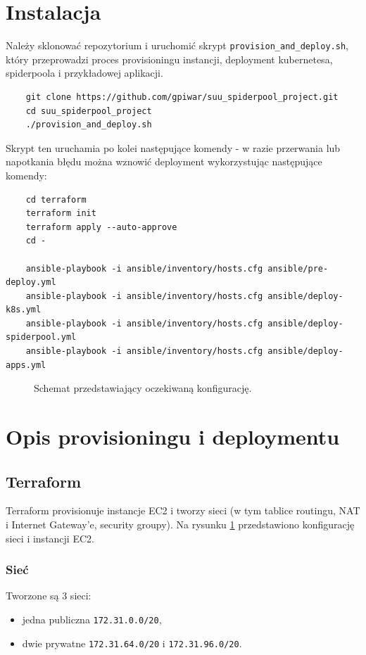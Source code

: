 \documentclass[onecolumn,12pt]{article}
\begin{document}
\section{Instalacja}

Należy sklonować repozytorium i uruchomić skrypt \texttt{provision\_and\_deploy.sh}, który przeprowadzi proces provisioningu instancji, deployment kubernetesa, spiderpoola i przykładowej aplikacji.

\begin{verbatim}
    git clone https://github.com/gpiwar/suu_spiderpool_project.git
    cd suu_spiderpool_project
    ./provision_and_deploy.sh
\end{verbatim}

Skrypt ten uruchamia po kolei następujące komendy - w razie przerwania lub napotkania błędu można wznowić deployment wykorzystując następujące komendy:
\begin{verbatim}
    cd terraform
    terraform init
    terraform apply --auto-approve
    cd -

    ansible-playbook -i ansible/inventory/hosts.cfg ansible/pre-deploy.yml
    ansible-playbook -i ansible/inventory/hosts.cfg ansible/deploy-k8s.yml
    ansible-playbook -i ansible/inventory/hosts.cfg ansible/deploy-spiderpool.yml
    ansible-playbook -i ansible/inventory/hosts.cfg ansible/deploy-apps.yml
\end{verbatim}

\begin{figure}[!htpb]
    \centering
    
    \caption{Schemat przedstawiający oczekiwaną konfigurację.}
    \label{fig:diagram}
\end{figure}

\section{Opis provisioningu i deploymentu}

\subsection{Terraform}
Terraform provisionuje instancje EC2 i tworzy sieci (w tym tablice routingu, NAT i Internet Gateway'e, security groupy).
Na rysunku \ref{fig:diagram} przedstawiono konfigurację sieci i instancji EC2.

\subsubsection{Sieć}
Tworzone są 3 sieci: 
\begin{itemize}
    \item jedna publiczna \texttt{172.31.0.0/20},
    \item dwie prywatne \texttt{172.31.64.0/20} i \texttt{172.31.96.0/20}.
\end{itemize}
\end{document}
